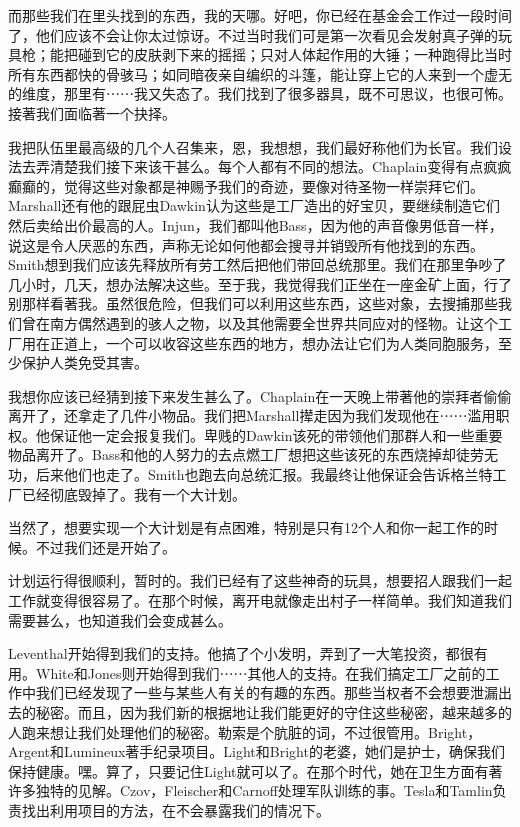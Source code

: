 而那些我们在里头找到的东西，我的天哪。好吧，你已经在基金会工作过一段时间了，他们应该不会让你太过惊讶。不过当时我们可是第一次看见会发射真子弹的玩具枪；能把碰到它的皮肤剥下来的摇摇；只对人体起作用的大锤；一种跑得比当时所有东西都快的骨骇马；如同暗夜亲自编织的斗篷，能让穿上它的人来到一个虚无的维度，那里有⋯⋯我又失态了。我们找到了很多器具，既不可思议，也很可怖。接著我们面临著一个抉择。

我把队伍里最高级的几个人召集来，恩，我想想，我们最好称他们为长官。我们设法去弄清楚我们接下来该干甚么。每个人都有不同的想法。Chaplain变得有点疯疯癫癫的，觉得这些对象都是神赐予我们的奇迹，要像对待圣物一样崇拜它们。Marshall还有他的跟屁虫Dawkin认为这些是工厂造出的好宝贝，要继续制造它们然后卖给出价最高的人。Injun，我们都叫他Bass，因为他的声音像男低音一样，说这是令人厌恶的东西，声称无论如何他都会搜寻并销毁所有他找到的东西。Smith想到我们应该先释放所有劳工然后把他们带回总统那里。我们在那里争吵了几小时，几天，想办法解决这些。至于我，我觉得我们正坐在一座金矿上面，行了别那样看著我。虽然很危险，但我们可以利用这些东西，这些对象，去搜捕那些我们曾在南方偶然遇到的骇人之物，以及其他需要全世界共同应对的怪物。让这个工厂用在正道上，一个可以收容这些东西的地方，想办法让它们为人类同胞服务，至少保护人类免受其害。

我想你应该已经猜到接下来发生甚么了。Chaplain在一天晚上带著他的崇拜者偷偷离开了，还拿走了几件小物品。我们把Marshall撵走因为我们发现他在⋯⋯滥用职权。他保证他一定会报复我们。卑贱的Dawkin该死的带领他们那群人和一些重要物品离开了。Bass和他的人努力的去点燃工厂想把这些该死的东西烧掉却徒劳无功，后来他们也走了。Smith也跑去向总统汇报。我最终让他保证会告诉格兰特工厂已经彻底毁掉了。我有一个大计划。

当然了，想要实现一个大计划是有点困难，特别是只有12个人和你一起工作的时候。不过我们还是开始了。

计划运行得很顺利，暂时的。我们已经有了这些神奇的玩具，想要招人跟我们一起工作就变得很容易了。在那个时候，离开电就像走出村子一样简单。我们知道我们需要甚么，也知道我们会变成甚么。

Leventhal开始得到我们的支持。他搞了个小发明，弄到了一大笔投资，都很有用。White和Jones则开始得到我们⋯⋯其他人的支持。在我们搞定工厂之前的工作中我们已经发现了一些与某些人有关的有趣的东西。那些当权者不会想要泄漏出去的秘密。而且，因为我们新的根据地让我们能更好的守住这些秘密，越来越多的人跑来想让我们处理他们的秘密。勒索是个肮脏的词，不过很管用。Bright，Argent和Lumineux著手纪录项目。Light和Bright的老婆，她们是护士，确保我们保持健康。嘿。算了，只要记住Light就可以了。在那个时代，她在卫生方面有著许多独特的见解。Czov，Fleischer和Carnoff处理军队训练的事。Tesla和Tamlin负责找出利用项目的方法，在不会暴露我们的情况下。

